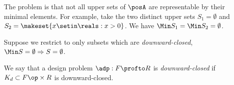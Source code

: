 The problem is that not all upper sets of $\posA$ are representable by their minimal elements.
For example, take the two distinct upper sets $S_1 = \emptyset$ and $S_2 = \makeset{x \setin \reals : x > 0}$.
We have $\Min S_1 = \Min S_2 = \emptyset$.

Suppose we restrict to only subsets which are \emph{downward-closed}, \ie  $\Min S = \emptyset \Rightarrow S = \emptyset$.





We say that a design problem $\adp : F \profto R$ is \emph{downward-closed} if $K_d \subset F\op \times R$ is downward-closed.


